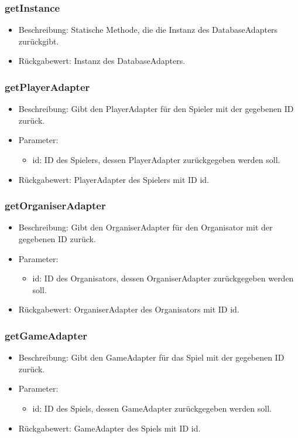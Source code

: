 \documentclass[a4paper]{scrreprt}
\begin{document}
	\subsubsection{getInstance}
	\begin{itemize}
		\item Beschreibung: Statische Methode, die die Instanz des DatabaseAdapters zurückgibt.
		\item Rückgabewert: Instanz des DatabaseAdapters.
	\end{itemize}

	\subsubsection{getPlayerAdapter}
	\begin{itemize}
		\item Beschreibung: Gibt den PlayerAdapter für den Spieler mit der gegebenen ID zurück.
		\item Parameter:
		\begin{itemize}
			\item id: ID des Spielers, dessen PlayerAdapter zurückgegeben werden soll.
		\end{itemize}
		\item Rückgabewert: PlayerAdapter des Spielers mit ID id.
	\end{itemize}

	\subsubsection{getOrganiserAdapter}
	\begin{itemize}
		\item Beschreibung: Gibt den OrganiserAdapter für den Organisator mit der gegebenen ID zurück.
		\item Parameter:
		\begin{itemize}
			\item id: ID des Organisators, dessen OrganiserAdapter zurückgegeben werden soll.
		\end{itemize}
		\item Rückgabewert: OrganiserAdapter des Organisators mit ID id.
	\end{itemize}

	\subsubsection{getGameAdapter}
	\begin{itemize}
		\item Beschreibung: Gibt den GameAdapter für das Spiel mit der gegebenen ID zurück.
		\item Parameter:
		\begin{itemize}
			\item id: ID des Spiels, dessen GameAdapter zurückgegeben werden soll.
		\end{itemize}
		\item Rückgabewert: GameAdapter des Spiels mit ID id.
	\end{itemize}
\end{document}
